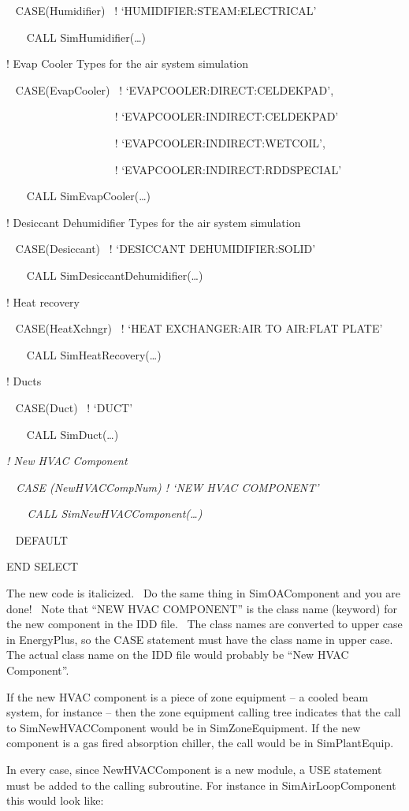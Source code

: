 ~ CASE(Humidifier)~ ! `HUMIDIFIER:STEAM:ELECTRICAL'

~~~ CALL SimHumidifier(\ldots{})

! Evap Cooler Types for the air system simulation

~ CASE(EvapCooler)~ ! `EVAPCOOLER:DIRECT:CELDEKPAD',

~~~~~~~~~~~~~~~~~~~ ! `EVAPCOOLER:INDIRECT:CELDEKPAD'

~~~~~~~~~~~~~~~~~~~ ! `EVAPCOOLER:INDIRECT:WETCOIL',

~~~~~~~~~~~~~~~ ~~~~! `EVAPCOOLER:INDIRECT:RDDSPECIAL'

~~~ CALL SimEvapCooler(\ldots{})

! Desiccant Dehumidifier Types for the air system simulation

~ CASE(Desiccant)~ ! `DESICCANT DEHUMIDIFIER:SOLID'

~~~ CALL SimDesiccantDehumidifier(\ldots{})

! Heat recovery

~ CASE(HeatXchngr)~ ! `HEAT EXCHANGER:AIR TO AIR:FLAT PLATE'

~~~ CALL SimHeatRecovery(\ldots{})

! Ducts

~ CASE(Duct)~ ! `DUCT'

~~~ CALL SimDuct(\ldots{})

\emph{! New HVAC Component}

\emph{~ CASE (NewHVACCompNum) ! `NEW HVAC COMPONENT'}

\emph{~~~ CALL SimNewHVACComponent(\ldots{})}

~ DEFAULT

END SELECT

The new code is italicized.~ Do the same thing in SimOAComponent and you are done!~ Note that ``NEW HVAC COMPONENT'' is the class name (keyword) for the new component in the IDD file.~ The class names are converted to upper case in EnergyPlus, so the CASE statement must have the class name in upper case.~ The actual class name on the IDD file would probably be ``New HVAC Component''.

If the new HVAC component is a piece of zone equipment -- a cooled beam system, for instance -- then the zone equipment calling tree indicates that the call to SimNewHVACComponent would be in SimZoneEquipment. If the new component is a gas fired absorption chiller, the call would be in SimPlantEquip.

In every case, since NewHVACComponent is a new module, a USE statement must be added to the calling subroutine. For instance in SimAirLoopComponent this would look like:


